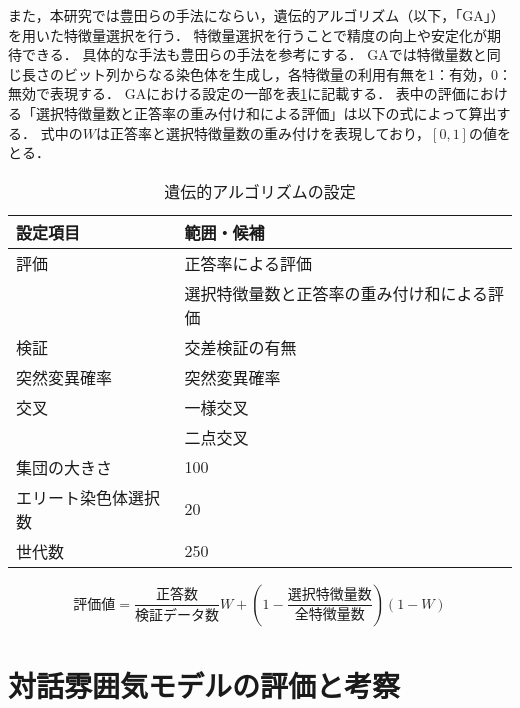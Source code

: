 また，本研究では豊田らの手法にならい，遺伝的アルゴリズム（以下，「GA」）を用いた特徴量選択を行う．
特徴量選択を行うことで精度の向上や安定化が期待できる．
具体的な手法も豊田らの手法を参考にする．
GAでは特徴量数と同じ長さのビット列からなる染色体を生成し，各特徴量の利用有無を1：有効，0：無効で表現する．
GAにおける設定の一部を表\ref{tab:ga_setting}に記載する．
表中の評価における「選択特徴量数と正答率の重み付け和による評価」は以下の式によって算出する．
式中の$W$は正答率と選択特徴量数の重み付けを表現しており，$[0, 1]$の値をとる．

\begin{table}[t]
    \caption{遺伝的アルゴリズムの設定}
    \centering
    \begin{tabular}{ll}
        \hline
        設定項目 & 範囲・候補 \\
        \hline\hline
        評価 & 正答率による評価 \\
        & 選択特徴量数と正答率の重み付け和による評価 \\
        \hline
        検証 & 交差検証の有無 \\
        \hline
        突然変異確率 & 突然変異確率 \\
        \hline
        交叉  & 一様交叉 \\
        & 二点交叉 \\
        \hline
        集団の大きさ  & 100 \\
        \hline
        エリート染色体選択数  & 20 \\
        \hline
        世代数  & 250 \\
        \hline
    \end{tabular}
    \label{tab:ga_setting}
\end{table}

\begin{equation}
    評価値 = \frac{正答数}{検証データ数} W + (1 - \frac{選択特徴量数}{全特徴量数}) (1 - W)
\end{equation}

\section{対話雰囲気モデルの評価と考察}

